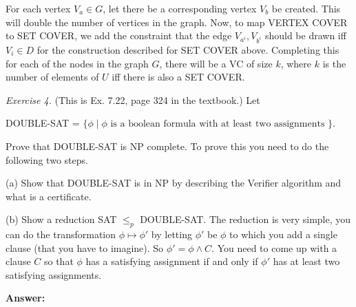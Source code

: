 \documentclass[11pt]{article}
\begin{document}

For each vertex $V_a \in G$, let there be a corresponding vertex $V_b$ be created. This will double the number of vertices in the graph. Now, to map VERTEX COVER to SET COVER, we add the constraint that the edge $V_{a^i}, V_{b^i}$ should be drawn iff $V_i \in D$ for the construction described for SET COVER above. Completing this for each of the nodes in the graph $G$, there will be a VC of size $k$, where $k$ is the number of elements of $U$ iff there is also a SET COVER.

\bigskip

\emph{Exercise 4.} (This is Ex. 7.22, page 324 in the textbook.) Let
\smallskip

\quad \quad DOUBLE-SAT = $\{\phi \mid \phi \textrm{ is a boolean formula with at least two assignments } \}$.
\smallskip

Prove that DOUBLE-SAT is NP complete.   To prove this you need to do the following two steps.
\smallskip

(a) Show that DOUBLE-SAT is in NP by describing the Verifier algorithm and what is a certificate.
\smallskip

(b) Show a reduction SAT $\leq_p$ DOUBLE-SAT. The reduction is very simple, you can do the transformation $\phi \mapsto \phi'$ by letting $\phi'$ be $\phi$ to which you add a single clause (that you have to imagine). So $\phi' = \phi \wedge C$. You need to come up with a clause $C$ so that $\phi$ has a satisfying assignment if and only if $\phi'$ has at least two satisfying assignments.

\textbf{Answer:}
\end{document}
